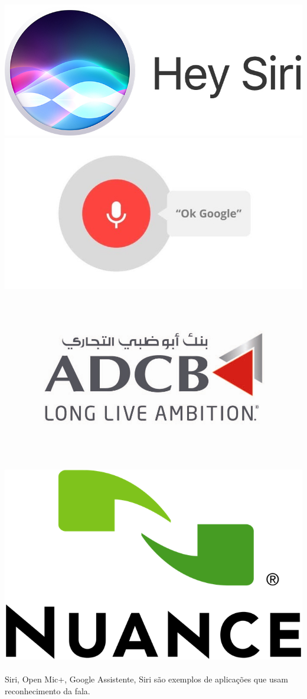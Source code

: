 \documentclass[10pt, compress]{beamer}
\begin{document}
\begin{frame}
\includegraphics[scale=0.1]{images/siri.jpg} \hfill
\includegraphics[scale=0.1]{images/okgoogle.jpg} \hfill
\includegraphics[scale=0.1]{images/bank.jpg} \hfill
\includegraphics[scale=0.1]{images/nuance.png} \\ \\
  \alert{Siri}, \alert{Open Mic+}, \alert{Google Assistente}, \alert{Siri} são exemplos de aplicações que usam reconhecimento da fala.
\end{frame}
\end{document}
